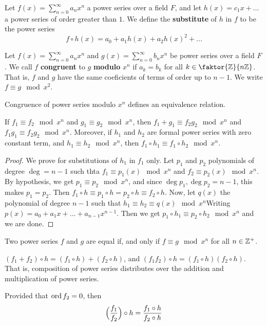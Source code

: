 \begin{definition}
    Let $f(x)=\sum_{n=0}^\infty{a_nx^n}$ a power series over a field $F$, and
    let $h(x)=c_1x+\dots$ a power series of order greater than $1$. We define
    the  \textbf{substitute} of $h$ in  $f$ to be the power series
    \begin{equation*}
        f \circ h(x)=a_0+a_1h(x)+a_2h(x)^2+\dots
    \end{equation*}
\end{definition}

\begin{definition}
    Let $f(x)=\sum_{n=0}^\infty{a_nx^n}$ and $g(x)=\sum_{n=0}^\infty{b_nx^n}$ be
    power series over a field $F$. We call  $f$ \textbf{congruent} to $g$
    \textbf{modulo} $x^n$ if  $a_k=b_k$ for all  $k \in \faktor{\Z}{n\Z}$. That
    is, $f$ and $g$ have the same coeficients of terms of order up to $n-1$. We
    write $f \equiv g \mod{x^2}$.
\end{definition}

\begin{lemma}\label{2.1.4}
    Congruence of power series modulo $x^n$ defines an equivalence relation.
\end{lemma}

\begin{lemma}\label{2.1.5}
    If $f_1 \equiv f_2 \mod{x^n}$ and $g_1 \equiv g_2 \mod{x^n}$, then $f_1+g_1
    \equiv f_2g_2 \mod{x^n}$ and $f_1g_1 \equiv f_2g_2 \mod{x^n}$. Moreover, if
    $h_1$ and $h_2$ are formal power series with zero constant term, and $h_1
    \equiv h_2 \mod{x^n}$, then $f_1 \circ h_1 \equiv f_1 \circ h_2 \mod{x^n}$.
\end{lemma}
\begin{proof}
    We prove for substitutions of $h_1$ in $f_1$ only. Let $p_1$ and $p_2$
    polynomials of degree $\deg=n-1$ such thta  $f_1 \equiv p_1(x) \mod{x^n}$
    and $f_2 \equiv p_2(x) \mod{x^n}$. By hypothesis, we get $p_1 \equiv p_2
    \mod{x^n}$, and since $\deg{p_1},\deg{p_2}=n-1$, this makes $p_1=p_2$.
    Then $f_1 \circ h \equiv p_1 \circ h=p_2 \circ h \equiv f_2 \circ h$. Now,
    let $q(x)$ the polynomial of degree $n-1$  such that $h_1 \equiv h_2 \equiv
    q(x) \mod{x^n}$Writing $p(x)=a_0+a_1x+\dots+a_{n-1}x^{n-1}$. Then we get
    $p_1 \circ h_1 \equiv p_2 \circ h_2 \mod{x^n}$ and we are done.
\end{proof}
\begin{corollary}
    Two power series $f$ and $g$ are equal if, and only if $f \equiv g
    \mod{x^n}$ for all $n \in \mathbb{Z}^+$.
\end{corollary}
\begin{corollary}
    $(f_1+f_2) \circ h=(f_1 \circ h)+(f_2 \circ h)$, and $(f_1f_2) \circ h=(f_1
    \circ h)(f_2 \circ h)$. That is, composition of power series distributes
    over the addition and multiplication of power series.
\end{corollary}
\begin{corollary}
    Provided that $\operatorname{ord}{f_2}=0$, then
    \begin{equation*}
        \Big{(}\frac{f_1}{f_2}\Big{)} \circ h=\frac{f_1 \circ h}{f_2 \circ h}
    \end{equation*}
\end{corollary}

